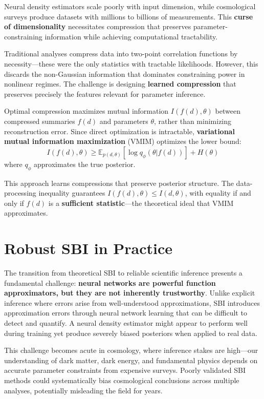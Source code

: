 \documentclass{SciPost}
\begin{document}
Neural density estimators scale poorly with input dimension, while cosmological surveys produce datasets with millions to billions of measurements. This \textbf{curse of dimensionality} necessitates compression that preserves parameter-constraining information while achieving computational tractability.

Traditional analyses compress data into two-point correlation functions by necessity—these were the only statistics with tractable likelihoods. However, this discards the non-Gaussian information that dominates constraining power in nonlinear regimes. The challenge is designing \textbf{learned compression} that preserves precisely the features relevant for parameter inference.


Optimal compression maximizes mutual information $I(f(d), \theta)$ between compressed summaries $f(d)$ and parameters $\theta$, rather than minimizing reconstruction error. Since direct optimization is intractable, \textbf{variational mutual information maximization} (VMIM) optimizes the lower bound:
\begin{equation}
    I(f(d), \theta) \geq \mathbb{E}_{p(d,\theta)}[\log q_\phi(\theta|f(d))] + H(\theta)
\end{equation}
where $q_\phi$ approximates the true posterior.

This approach learns compressions that preserve posterior structure. The data-processing inequality guarantees $I(f(d), \theta) \leq I(d, \theta)$, with equality if and only if $f(d)$ is a \textbf{sufficient statistic}—the theoretical ideal that VMIM approximates.


\section{Robust SBI in Practice}

The transition from theoretical SBI to reliable scientific inference presents a fundamental challenge: \textbf{neural networks are powerful function approximators, but they are not inherently trustworthy}. Unlike explicit inference where errors arise from well-understood approximations, SBI introduces approximation errors through neural network learning that can be difficult to detect and quantify. A neural density estimator might appear to perform well during training yet produce severely biased posteriors when applied to real data.

This challenge becomes acute in cosmology, where inference stakes are high—our understanding of dark matter, dark energy, and fundamental physics depends on accurate parameter constraints from expensive surveys. Poorly validated SBI methods could systematically bias cosmological conclusions across multiple analyses, potentially misleading the field for years.
\end{document}
